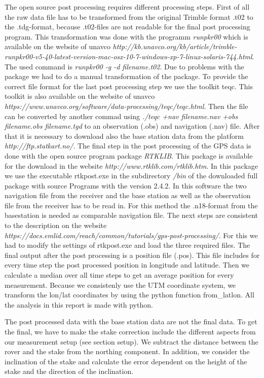 The open source post processing requires different processing steps.
First of all the raw data file has to be transformed from the original Trimble format .t02 to the .tdg-format, because .t02-files are not readable for the final post processing program.
This transformation was done with the programm \textit{runpkr00} which is available on the website of unavco \textit{http://kb.unavco.org/kb/article/trimble-runpkr00-v5-40-latest-version-mac-osx-10-7-windows-xp-7-linux-solaris-744.html}.
The used command is \textit{runpkr00 -g -d filename.t02}.
Due to problems with the package we had to do a manual transformation of the package.
To provide the correct file format for the last post processing step we use the toolkit teqc.
This toolkit is also available on the website of unavco \textit{https://www.unavco.org/software/data-processing/teqc/teqc.html}.
Then the file can be converted by another commad using \textit{./teqc +nav filename.nav +obs filename.obs filename.tgd} to an observation (.obs) and navigation (.nav) file.
After that it is necessary to download also the base station data from the platform \textit{http://ftp.statkart.no/}.
The final step in the post processing of the GPS data is done with the open source program package \textit{RTKLIB}.
This package is available for the download in the website \textit{http://www.rtklib.com/rtklib.htm}.
In this package we use the executable rtkpost.exe in the subdirectory \textit{/bin} of the downloaded full package with source Programs with the version 2.4.2.
In this software the two navigation file from the receiver and the base station as well as the observation file from the receiver has to be read in.
For this method the .n18-format from the basestation is needed as comparable navigation file.
The next steps are consistent to the description on the website \textit{https://docs.emlid.com/reach/common/tutorials/gps-post-processing/}.
For this we had to modify the settings of rtkpost.exe and load the three required files. 
The final output after the post processing is a position file (.pos). 
This file includes for every time step the post processed position in longitude and latitude.
Then we calculate a median over all time steps to get an average position for every measurement.
Because we consistenly use the UTM coordinate system, we transform the lon/lat coordinates by using the python function from\_latlon.
All the analysis in this report is made with python.\medskip

The post processed data with the base station data are not the final data. 
To get the final, we have to make the stake correction include the different aspects from our measurement setup (see section setup).
We subtract the distance between the rover and the stake from the northing component.
In addition, we consider the inclination of the stake and calculate the error dependent on the height of the stake and the direction of the inclination.\medskip

